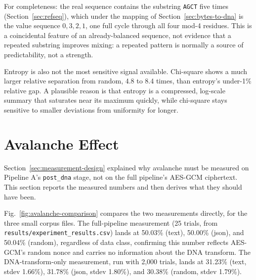 \documentclass[12pt,a4paper,twoside]{report}
\numberwithin{equation}{chapter}
\begin{document}
For completeness: the real sequence contains the substring
\texttt{AGCT} five times (Section~\ref{sec:refseq}), which under the
mapping of Section~\ref{sec:bytes-to-dna} is the value sequence
$0,3,2,1$, one full cycle through all four mod-4 residues. This is a
coincidental feature of an already-balanced sequence, not evidence that
a repeated substring improves mixing: a repeated pattern is normally a
source of predictability, not a strength.

Entropy is also not the most sensitive signal available. Chi-square
shows a much larger relative separation from random, 4.8 to 8.4 times,
than entropy's under-1\% relative gap. A plausible reason is that
entropy is a compressed, log-scale summary that saturates near its
maximum quickly, while chi-square stays sensitive to smaller deviations
from uniformity for longer.

\section{Avalanche Effect}
\label{sec:results-avalanche}
Section~\ref{sec:measurement-design} explained why avalanche must be measured on
Pipeline A's \texttt{post\_dna} stage, not on the full pipeline's
AES-GCM ciphertext. This section reports the measured numbers and then
derives what they should have been.

Fig.~\ref{fig:avalanche-comparison} compares the two measurements
directly, for the three small corpus files. The full-pipeline
measurement (25 trials, from \texttt{results/experiment\_results.csv})
lands at 50.03\% (text), 50.00\% (json), and 50.04\% (random),
regardless of data class, confirming this number reflects AES-GCM's
random nonce and carries no information about the DNA transform. The
DNA-transform-only measurement, run with 2,000 trials, lands at 31.23\%
(text, stdev 1.66\%), 31.78\% (json, stdev 1.80\%), and 30.38\%
(random, stdev 1.79\%).
\end{document}
